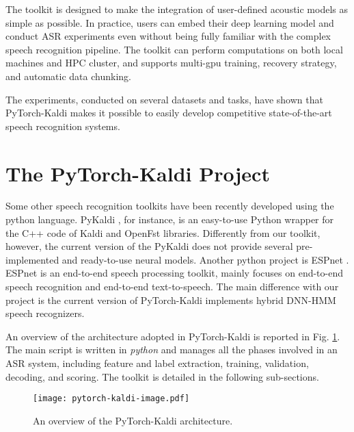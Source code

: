 \documentclass{article}
\begin{document}
The toolkit is designed to make the integration of user-defined acoustic models as simple as possible. In practice, users can embed their deep learning model and conduct ASR experiments even without being fully familiar with the complex speech recognition pipeline. The toolkit can perform computations on both local machines and HPC cluster, and supports multi-gpu training, recovery strategy, and automatic data chunking.

The experiments, conducted on several datasets and tasks, have shown that PyTorch-Kaldi makes it possible to easily develop competitive state-of-the-art speech recognition systems.





\section{The PyTorch-Kaldi Project}
Some other speech recognition toolkits have been recently developed using the python language. PyKaldi \cite{pykaldi}, for instance, is an easy-to-use Python wrapper for the C++ code of Kaldi and OpenFst libraries. Differently from our toolkit, however, the current version of the PyKaldi does not provide several pre-implemented and ready-to-use neural models.  Another python project is ESPnet \cite{ESPnet}. ESPnet is an end-to-end speech processing toolkit, mainly focuses on end-to-end speech recognition and end-to-end text-to-speech. The main difference with our project is the current version of PyTorch-Kaldi implements hybrid DNN-HMM speech recognizers.

An overview of the architecture adopted in PyTorch-Kaldi is reported in Fig. \ref{fig:arch}. The main script \textit{} is written in \textit{python} and manages all the phases involved in an ASR system, including feature and label extraction, training, validation, decoding, and scoring.
The toolkit is detailed in the following sub-sections.


 \begin{figure}[t!]
 \centering
   \texttt{[image: pytorch-kaldi-image.pdf]}
 \caption{An overview of the PyTorch-Kaldi architecture.}
 \label{fig:arch}
 \end{figure}
 
\end{document}
